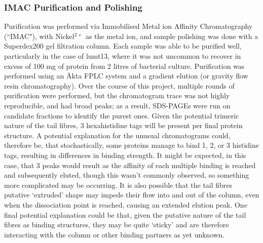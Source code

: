 \subsubsection{IMAC Purification and Polishing}
Purification was performed via Immobilised Metal ion Affinity Chromatography (``IMAC"), with Nickel$^{2+}$ as the metal ion, and sample polishing was done with a Superdex200 gel filtration column. Each sample was able to be purified well, particularly in the case of lumt13, where it was not uncommon to recover in excess of 100 mg of protein from 2 litres of bacterial culture. Purification was performed using an \"Akta FPLC system and a gradient elution (or gravity flow resin chromatography). Over the course of this project, multiple rounds of purification were performed, but the chromatogram trace was not highly reproducible, and had broad peaks; as a result, SDS-PAGEs were run on candidate fractions to identify the purest ones. Given the potential trimeric nature of the tail fibres, 3 hexahistidine tags will be present per final protein structure. A potential explanation for the unusual chromatograms could, therefore be, that stochastically, some proteins manage to bind 1, 2, or 3 histidine tags, resulting in differences in binding strength. It might be expected, in this case, that 3 peaks would result as the affinity of each multiple binding is reached and subsequently eluted, though this wasn't commonly observed, so something more complicated may be occurring. It is also possible that the tail fibres putative `extruded' shape may impede their flow into and out of the column, even when the dissociation point is reached, causing an extended elution peak. One final potential explanation could be that, given the putative nature of the tail fibres as binding structures, they may be quite `sticky' and are therefore interacting with the column or other binding partners as yet unknown.

